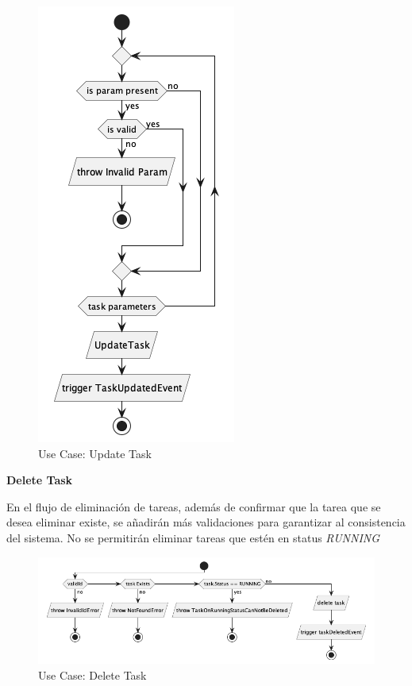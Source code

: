\begin{figure}[H]
    \centering
    \includegraphics[height=0.4\textheight]{./part/Proyecto_ejecutivo/memoria_descriptiva/descripcionDelProyecto/manager/uml/updateTaskUseCase}
    \caption{Use Case: Update Task}\label{fig:Use Case-Update Task}
\end{figure}

\textbf{Delete Task}

En el flujo de eliminación de tareas, además de confirmar que la tarea que se desea eliminar existe, se añadirán más validaciones para garantizar al consistencia del sistema. No se permitirán eliminar tareas que estén en status \textit{RUNNING}

\begin{figure}[H]
    \centering
    \includegraphics[height=0.2\textheight]{./part/Proyecto_ejecutivo/memoria_descriptiva/descripcionDelProyecto/manager/uml/deleteTaskUseCase}
    \caption{Use Case: Delete Task}\label{fig:Use Case-Delete Task}
\end{figure}

